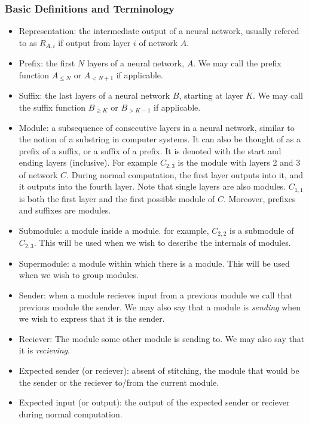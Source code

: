 \documentclass{article} %
\begin{document}
\subsubsection*{Basic Definitions and Terminology}
\begin{itemize}
   \item Representation: the intermediate output of a neural network, usually refered to as \(R_{A, i}\) if output from layer \(i\) of network \(A\).
   \item Prefix: the first \(N\) layers of a neural network, \(A\). We may call the prefix function \(A_{\leq N}\) or \(A_{<N+1}\) if applicable.
   \item Suffix: the last layers of a neural network \(B\), starting at layer \(K\). We may call the suffix function \(B_{\geq K}\) or \(B_{>K-1}\) if applicable.
   \item Module: a subsequence of consecutive layers in a neural network, similar to the notion of a substring in computer systems. It can also be thought of as a prefix of a suffix, or a suffix of a prefix. It is denoted with the start and ending layers (inclusive). For example \(C_{2,3}\) is the module with layers 2 and 3 of network \(C\). During normal computation, the first layer outputs into it, and it outputs into the fourth layer. Note that single layers are also modules. \(C_{1,1}\) is both the first layer and the first possible module of \(C\). Moreover, prefixes and suffixes are modules.
   \item Submodule: a module inside a module. for example, \(C_{2,2}\) is a submodule of \(C_{2,3}\). This will be used when we wish to describe the internals of modules.
   \item Supermodule: a module within which there is a module. This will be used when we wish to group modules.
   \item Sender: when a module recieves input from a previous module we call that previous module the sender. We may also say that a module is \emph{sending} when we wish to express that it is the sender.
   \item Reciever: The module some other module is sending to. We may also say that it is \emph{recieving}.
   \item Expected sender (or reciever): absent of stitching, the module that would be the sender or the reciever to/from the current module.
   \item Expected input (or output): the output of the expected sender or reciever during normal computation.
\end{itemize}
\end{document}
